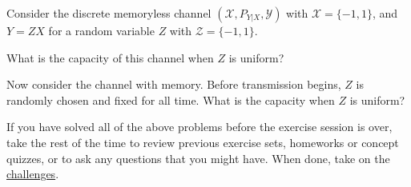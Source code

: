 \documentclass[a4paper,10pt,landscape,twocolumn]{scrartcl}
\begin{document}
\begin{exercise}
Consider the discrete memoryless channel $(\mathcal{X}, P_{Y|X}, \mathcal{Y})$ with $\mathcal{X} = \{-1,1\}$, and $Y = ZX$ for a random variable $Z$ with $\mathcal{Z} = \{-1,1\}$.
\begin{subex}
What is the capacity of this channel when $Z$ is uniform?
\end{subex}
\begin{subex}
Now consider the channel with memory. Before transmission begins, $Z$ is randomly chosen and fixed for all time. What is the capacity when $Z$ is uniform?
\end{subex}
\end{exercise}

\begin{exercise}[Practice]
If you have solved all of the above problems before the exercise session is over, take the rest of the time to review previous exercise sets, homeworks or concept quizzes, or to ask any questions that you might have. When done, take on the \href{https://www.moodle.ch/lms/mod/forum/view.php?id=1788}{challenges}.
\end{exercise}
\end{document}

